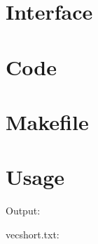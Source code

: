 \documentclass[12pt, a4paper]{article}
\begin{document}
\section{Interface}

\begin{scriptsize}
\begin{ttfamily}

\end{ttfamily}
\end{scriptsize}

\section{Code}

\begin{scriptsize}
\begin{ttfamily}

\end{ttfamily}
\end{scriptsize}

\section{Makefile}

\begin{scriptsize}
\begin{ttfamily}

\end{ttfamily}
\end{scriptsize}

\section{Usage}

\begin{scriptsize}
\begin{ttfamily}

\end{ttfamily}
\end{scriptsize}

Output:\\
\begin{scriptsize}
\begin{ttfamily}

\end{ttfamily}
\end{scriptsize}

vecshort.txt:\\
\begin{scriptsize}
\begin{ttfamily}

\end{ttfamily}
\end{scriptsize}
\end{document}

